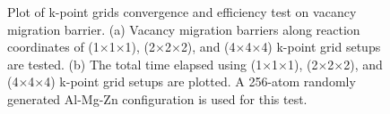 \begingroup
\begin{figure}[!ht]
  \centering
\caption[Plot of k-point grids convergence and efficiency test on vacancy migration barrier.]{Plot of k-point grids convergence and efficiency test on vacancy migration barrier. (a) Vacancy migration barriers along reaction coordinates of (1$\times$1$\times$1), (2$\times$2$\times$2), and (4$\times$4$\times$4) k-point grid setups are tested. (b) The total time elapsed using (1$\times$1$\times$1), (2$\times$2$\times$2), and (4$\times$4$\times$4) k-point grid setups are plotted. A 256-atom randomly generated Al-Mg-Zn configuration is used for this test.}
\label{Chap:Al/Vac:fig:kpoints}
\end{figure}
\endgroup

